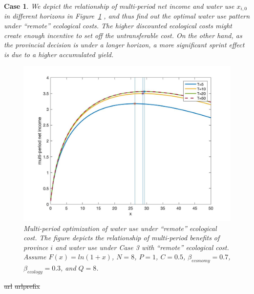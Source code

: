 \documentclass[default, sn-standardnature]{sn-jnl} %
\newtheorem{case_appendix}{Case}
\providecommand{\DIFdeltex}[1]{{\protect\color{red}\sout{#1}}}                      %
\providecommand{\DIFdelbegin}{} %
\providecommand{\DIFdel}[1]{\texorpdfstring{\DIFdeltex{#1}}{}} %
\newcommand{\DIFscaledelfig}{0.5}
\newlength{\DIFdelgraphicswidth} %
\newlength{\DIFdelgraphicsheight} %
\newcommand{\DIFdelincludegraphics}[2][]{%
\sbox{\DIFdelgraphicsbox}{\DIFOincludegraphics[#1]{#2}}%
\settoboxwidth{\DIFdelgraphicswidth}{\DIFdelgraphicsbox} %
\settoboxtotalheight{\DIFdelgraphicsheight}{\DIFdelgraphicsbox} %
\scalebox{\DIFscaledelfig}{%
\parbox[b]{\DIFdelgraphicswidth}{\usebox{\DIFdelgraphicsbox}\\[-\baselineskip] \rule{\DIFdelgraphicswidth}{0em}}\llap{\resizebox{\DIFdelgraphicswidth}{\DIFdelgraphicsheight}{%
\setlength{\unitlength}{\DIFdelgraphicswidth}%
\begin{picture}(1,1)%
\thicklines\linethickness{2pt} %
{\color[rgb]{1,0,0}\put(0,0){\framebox(1,1){}}}%
{\color[rgb]{1,0,0}\put(0,0){\line( 1,1){1}}}%
{\color[rgb]{1,0,0}\put(0,1){\line(1,-1){1}}}%
\end{picture}%
}\hspace*{3pt}}} %
} %
\DeclareRobustCommand{\DIFdelbegin}{\DIFOdelbegin \let\includegraphics\DIFdelincludegraphics} %
\begin{document}
\begin{case_appendix}
We depict the relationship of multi-period net income and water use $x_{i,0}$ in different horizons in Figure~\ref{fig:remote}
, and thus find out the optimal water use pattern under ``remote'' ecological costs. The higher discounted ecological costs might create enough incentive to set off the untransferable cost. On the other hand, as the provincial decision is under a longer horizon, a more significant sprint effect is due to a higher accumulated yield.

\begin{figure}[H]
    \centering
    \includegraphics[width=0.9\linewidth]{outputs/Fig4.jpg}
    \caption{Multi-period optimization of water use under ``remote'' ecological cost. The figure depicts the relationship of multi-period benefits of province $i$ and water use under Case 3 with ``remote'' ecological cost. Assume $F(x)=ln(1+x)$, $N=8$, $P=1$, $C=0.5$, $\beta_{economy}=0.7$, $\beta_{ecology}=0.3$, and $Q=8$.}
    \label{fig:remote}
\end{figure}

\end{case_appendix}


\DIFdelbegin %
\DIFdel{url}%
\DIFdel{urlprefix}%
\end{document}
